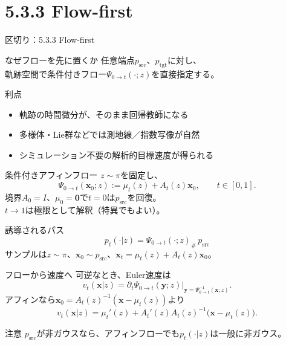 \section{5.3.3 Flow-first}
\asmain
\begin{frame}{区切り：5.3.3 Flow-first}
    \tableofcontents[currentsection]
\end{frame}
\asmain
\begin{frame}{なぜフローを先に置くか}
    任意端点$p_{\mathrm{src}}$、$p_{\mathrm{tgt}}$に対し、\\
    軌跡空間で条件付きフロー$\Psi_{0\to t}(\cdot;z)$を直接指定する。
    \begin{block}{利点}
        \begin{itemize}
            \item 軌跡の時間微分が、そのまま回帰教師になる
            \item 多様体・Lie群などでは測地線／指数写像が自然
            \item シミュレーション不要の解析的目標速度が得られる
        \end{itemize}
    \end{block}
\end{frame}
\asmain
\begin{frame}{条件付きアフィンフロー}
    $z\sim\pi$を固定し、
    \[
        \Psi_{0\to t}(\bm{x}_0;z)
        :=
        \mu_t(z)+A_t(z)\bm{x}_0,
        \qquad t\in[0,1].
    \]
    境界$A_0=I$、$\mu_0=\bm{0}$で$t=0$は$p_{\mathrm{src}}$を回復。\\
    $t\to 1$は極限として解釈（特異でもよい）。
    \begin{block}{誘導されるパス}
        \[
            p_t(\cdot|z)=\Psi_{0\to t}(\cdot;z)_{\#}\,p_{\mathrm{src}}
        \]
        サンプルは$z\sim\pi$、$\bm{x}_0\sim p_{\mathrm{src}}$、$\bm{x}_t=\mu_t(z)+A_t(z)\bm{x}_0$。
    \end{block}
\end{frame}
\asmain
\begin{frame}{フローから速度へ}
    可逆なとき、Euler速度は
    \[
        v_t(\bm{x}|z)
        =
        \partial_t\Psi_{0\to t}(\bm{y};z)
        \Big|_{\bm{y}=\Psi_{0\to t}^{-1}(\bm{x};z)}.
    \]
    アフィンなら$\bm{x}_0=A_t(z)^{-1}(\bm{x}-\mu_t(z))$より
    \[
        v_t(\bm{x}|z)
        =
        \mu_t'(z)
        +
        A_t'(z)A_t(z)^{-1}\bigl(\bm{x}-\mu_t(z)\bigr).
    \]
    \begin{exampleblock}{注意}
        $p_{\mathrm{src}}$が非ガウスなら、アフィンフローでも$p_t(\cdot|z)$は一般に非ガウス。
    \end{exampleblock}
\end{frame}
